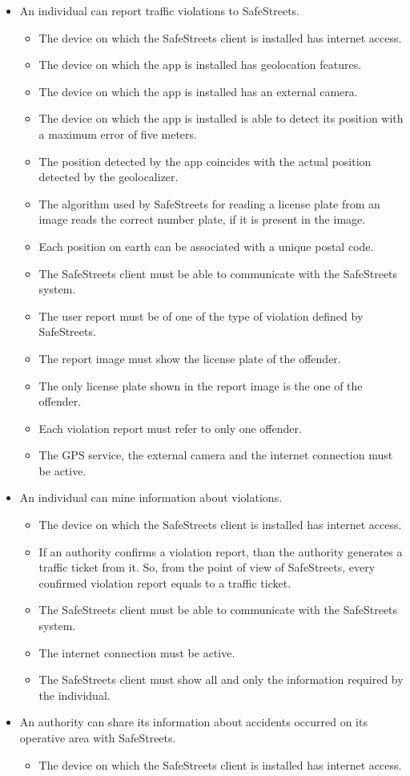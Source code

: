 \documentclass{article}
\newcommand\goal[1]{\item[{[G#1]}] }
\newcommand\requirement[1]{\item[{[R#1]}] }
\newcommand\assumption[1]{\item[{[A#1]}] }
\begin{document}
			\begin{itemize}
				\goal{1}An individual can report traffic violations to SafeStreets.
				\begin{itemize}
					\assumption{1} The device on which the SafeStreets client is installed has internet access.
					\assumption{2} The device on which the app is installed has geolocation features.
					\assumption{3} The device on which the app is installed has an external camera.
					\assumption{4} The device on which the app is installed is able to detect its position with a maximum error of five meters.
					\assumption{5} The position detected by the app coincides with the actual position detected by the geolocalizer.
					\assumption{6} The algorithm used by SafeStreets for reading a license plate from an image reads the correct number plate, if it is present in the image.
					\assumption{8} Each position on earth can be associated with a unique postal code.
					\requirement{1} The SafeStreets client must be able to communicate with the SafeStreets system.
					\requirement{2} The user report must be of one of the type of violation defined by SafeStreets.
					\requirement{3} The report image must show the license plate of the offender.
					\requirement{4} The only license plate shown in the report image is the one of the offender.
					\requirement{5} Each violation report must refer to only one offender.	
					\requirement{6} The GPS service, the external camera and the internet connection must be active.
				\end{itemize}
				\goal{2}An individual can mine information about violations.
				\begin{itemize}
					\assumption{1} The device on which the SafeStreets client is installed has internet access.
					\assumption{9} If an authority confirms a violation report, than the authority generates a traffic ticket from it. So, from the point of view of SafeStreets, every confirmed violation report equals to a traffic ticket.
					\requirement{1} The SafeStreets client must be able to communicate with the SafeStreets system.
					\requirement{2} The internet connection must be active.
					\requirement{3} The SafeStreets client must show all and only the information required by the individual.
				\end{itemize}					
				\goal{3}An authority can share its information about accidents occurred on its operative area with SafeStreets.
				\begin{itemize}
					\assumption{1} The device on which the SafeStreets client is installed has internet access.

\end{itemize}
\end{itemize}
\end{document}
